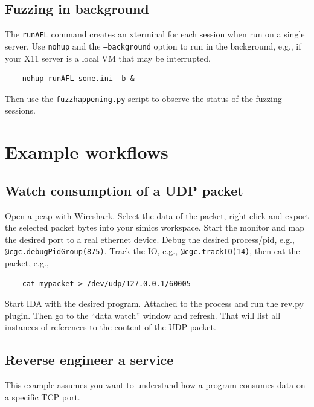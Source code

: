 \documentclass[titlepage]{article}
\begin{document}
\subsection{Fuzzing in background}
The {\tt runAFL} command creates an xterminal for each session when run on a single server.  Use {\tt nohup} and the {\tt --background} option to 
run in the background, e.g., if your X11 server is a local VM that may be interrupted.
\begin{verbatim}
    nohup runAFL some.ini -b &
\end{verbatim}
Then use the {\tt fuzzhappening.py} script to observe the status of the fuzzing sessions.

\section{Example workflows}
\label{example-workflows}
\subsection{Watch consumption of a UDP packet}
Open a pcap with Wireshark. Select the data of the packet, right click and export the selected packet bytes into your simics workspace.
Start the monitor and map the desired port to a real ethernet device.
Debug the desired process/pid, e.g., {\tt @cgc.debugPidGroup(875)}.  Track the IO, e.g., {\tt @cgc.trackIO(14)},
then cat the packet, e.g.,
\begin{verbatim}
    cat mypacket > /dev/udp/127.0.0.1/60005
\end{verbatim}

Start IDA with the desired program.  Attached to the process and run the rev.py plugin.  Then go to the ``data watch'' window and
refresh.  That will list all instances of references to the content of the UDP packet. 

\subsection{Reverse engineer a service}
This example assumes you want to understand how a program consumes
data on a specific TCP port.
\end{document}
